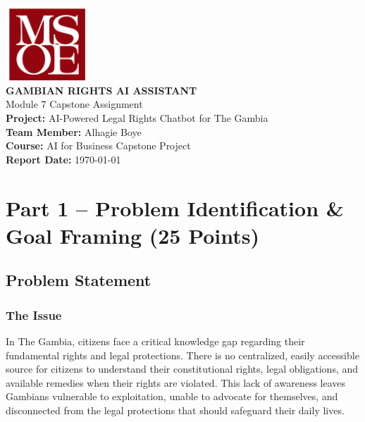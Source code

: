 \documentclass[12pt]{article}
\begin{document}
\begin{titlepage}
\centering

\includegraphics[width=3cm]{LOGO.png}\\[1cm]

{\Huge\bfseries\color{blue} GAMBIAN RIGHTS AI ASSISTANT}\\[0.5cm]

{\Large Module 7 Capstone Assignment}\\[2cm]

\textbf{Project:} AI-Powered Legal Rights Chatbot for The Gambia\\[0.5cm]
\textbf{Team Member:} Alhagie Boye\\[0.5cm]
\textbf{Course:} AI for Business Capstone Project\\[0.5cm]

\textbf{Report Date:} \today

\end{titlepage}

\newpage

\section{Part 1 – Problem Identification \& Goal Framing (25 Points)}

\subsection{Problem Statement}

\subsubsection{The Issue}
In The Gambia, citizens face a critical knowledge gap regarding their fundamental rights and legal protections. There is no centralized, easily accessible source for citizens to understand their constitutional rights, legal obligations, and available remedies when their rights are violated. This lack of awareness leaves Gambians vulnerable to exploitation, unable to advocate for themselves, and disconnected from the legal protections that should safeguard their daily lives.
\end{document}
